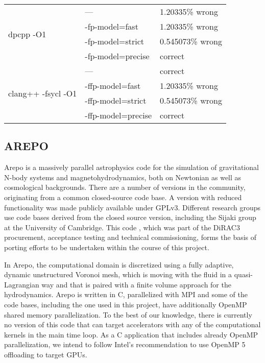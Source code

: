 \begin{center}
	\begin{table}
		\centering
		\begin{tabular}{||ll|l||}
			\hline
			\multirow{4}{*}{dpcpp -O1}          & ---                & 1.20335\% wrong  \\
			                                    & -fp-model=fast     & 1.20335\% wrong  \\
			                                    & -fp-model=strict   & 0.545073\% wrong \\
			                                    & -fp-model=precise  & correct          \\ \hline \hline
			\multirow{4}{*}{clang++ -fsycl -O1} & ---                & correct          \\
			                                    & -ffp-model=fast    & 1.20335\% wrong  \\
			                                    & -ffp-model=strict  & 0.545073\% wrong \\
			                                    & -ffp-model=precise & correct          \\ \hline
		\end{tabular}
		\caption{\label{tab:semantics}}
	\end{table}
\end{center}

\subsection{AREPO}

Arepo is a massively parallel astrophysics code for the simulation of gravitational N-body systems and magnetohydrodynamics, both on Newtonian as well as cosmological backgrounds. There are a number of versions in the community, originating from a common closed-source code base. A version with reduced functionality was made publicly available under GPLv3\cite{weinberger_arepo_2020, springel_arepo_nodate}. Different research groups use code bases derived from the closed source version, including the Sijaki group at the University of Cambridge. This code \cite{sijaki_arepo_nodate}, which was part of the DiRAC3 procurement, acceptance testing and technical commissioning, forms the basis of porting efforts to be undertaken within the course of this project.

In Arepo, the computational domain is discretized using a fully adaptive, dynamic unstructured Voronoi mesh, which is moving with the fluid in a quasi-Lagrangian way and that is paired with a finite volume approach for the hydrodynamics.
Arepo is written in C, parallelized with MPI and some of the code bases, including the one used in this project, have additionally OpenMP shared memory parallelization. To the best of our knowledge, there is currently no version of this code that can target accelerators with any of the computational kernels in the main time loop.
As a C application that includes already OpenMP parallelization, we intend to follow Intel's recommendation to use OpenMP 5 offloading to target GPUs.

